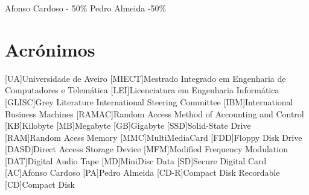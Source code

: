 \documentclass{report}
\begin{document}
Afonso Cardoso - 50\%
Pedro Almeida -50\%

\chapter*{Acrónimos}
\begin{acronym}
[UA]{Universidade de Aveiro}
[MIECT]{Mestrado Integrado em Engenharia de Computadores e Telemática}
[LEI]{Licenciatura em Engenharia Informática}
[GLISC]{Grey Literature International Steering Committee}
[IBM]{International Business Machines}
[RAMAC]{Random Access Method of Accounting and Control}
[KB]{Kilobyte}
[MB]{Megabyte}
[GB]{Gigabyte}
[SSD]{Solid-State Drive}
[RAM]{Random Acess Memory}
[MMC]{MultiMediaCard}
[FDD]{Floppy Disk Drive}
[DASD]{Direct Access Storage Device}
[MFM]{Modified Frequency Modulation}
[DAT]{Digital Audio Tape}
[MD]{MiniDisc Data}
[SD]{Secure Digital Card}
[AC]{Afonso Cardoso}
[PA]{Pedro Almeida}
[CD-R]{Compact Disk Recordable}
[CD]{Compact Disk}
\end{acronym}




\printbibliography
\end{document}

